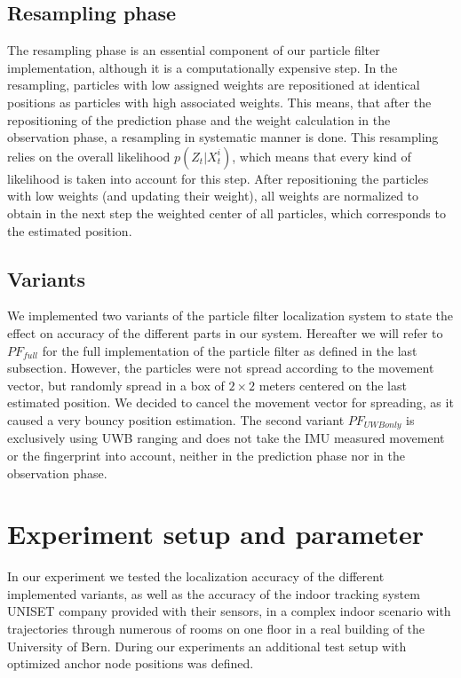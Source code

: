 \subsection{Resampling phase}
The resampling phase is an essential component of our particle filter implementation, although it is a computationally expensive step. In the resampling, particles with low assigned weights are repositioned at identical positions as particles with high associated weights. This means, that after the repositioning of the prediction phase and the weight calculation in the observation phase, a resampling in systematic manner is done. This resampling relies on the overall likelihood $p(Z_{t} | X^{i}_{t})$, which means that every kind of likelihood is taken into account for this step. After repositioning the particles with low weights (and updating their weight), all weights are normalized to obtain in the next step the weighted center of all particles, which corresponds to the estimated position. 
\subsection{Variants}
We implemented two variants of the particle filter localization system to state the effect on accuracy of the different parts in our system.
Hereafter we will refer to $PF_{full}$ for the full implementation of the particle filter as defined in the last subsection. However, the particles were not spread according to the movement vector, but randomly spread in a box of $2 \times 2$ meters centered on the last estimated position. We decided to cancel the movement vector for spreading, as it caused a very bouncy position estimation.
The second variant $PF_{UWBonly}$ is exclusively using UWB ranging and does not take the IMU measured movement or the fingerprint into account, neither in the prediction phase nor in the observation phase. 



\section{Experiment setup and parameter}
In our experiment we tested the localization accuracy of the different implemented variants, as well as the accuracy of the indoor tracking system UNISET company provided with their sensors, in a complex indoor scenario with trajectories through numerous of rooms on one floor in a real building of the University of Bern. During our experiments an additional test setup with optimized anchor node positions was defined.

